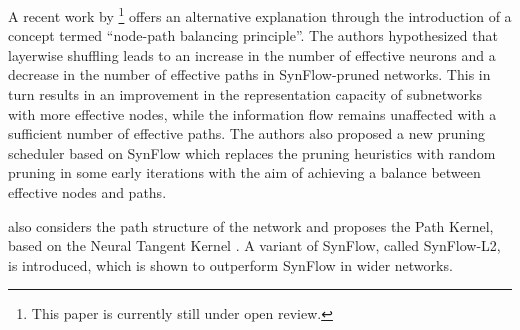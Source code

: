 A recent work by \textcite{pham23} \footnote[6]{This paper is currently still under open review.} offers an alternative explanation through the introduction of a concept termed ``node-path balancing principle''. The authors hypothesized that layerwise shuffling leads to an increase in the number of effective neurons and a decrease in the number of effective paths in SynFlow-pruned networks. This in turn results in an improvement in the representation capacity of subnetworks with more effective nodes, while the information flow remains unaffected with a sufficient number of effective paths. The authors also proposed a new pruning scheduler based on SynFlow which replaces the pruning heuristics with random pruning in some early iterations with the aim of achieving a balance between effective nodes and paths. 

\textcite{gebhart21} also considers the path structure of the network and proposes the Path Kernel, based on the Neural Tangent Kernel \autocite{jacot20}. A variant of SynFlow, called SynFlow-L2, is introduced, which is shown to outperform SynFlow in wider networks. 
